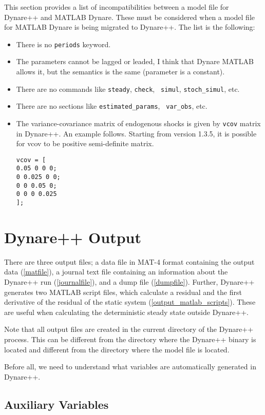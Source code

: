 \documentclass[10pt]{article}
\begin{document}
This section provides a list of incompatibilities between a model file
for Dy\-na\-re++ and MATLAB Dynare. These must be considered when a model
file for MATLAB Dynare is being migrated to Dynare++. The list is the
following:
\begin{itemize}
\item There is no {\tt periods} keyword.
\item The parameters cannot be lagged or leaded, I think that Dynare
MATLAB allows it, but the semantics is the same (parameter is a
constant).
\item There are no commands like {\tt steady}, {\tt check}, {\tt
simul}, {\tt stoch\_simul}, etc.
\item There are no sections like {\tt estimated\_params}, {\tt
var\_obs}, etc.
\item The variance-covariance matrix of endogenous shocks is given by
{\tt vcov} matrix in Dynare++. An example follows. Starting from
version 1.3.5, it is possible for vcov to be positive semi-definite
matrix.
{\small
\begin{verbatim}
vcov = [
0.05 0 0 0;
0 0.025 0 0;
0 0 0.05 0;
0 0 0 0.025
];
\end{verbatim}
}

\end{itemize}

\section{Dynare++ Output}

There are three output files; a data file in MAT-4 format containing
the output data (\ref{matfile}), a journal text file containing an
information about the Dynare++ run (\ref{journalfile}), and a dump
file (\ref{dumpfile}). Further, Dynare++ generates two MATLAB script
files, which calculate a residual and the first derivative of the
residual of the static system (\ref{output_matlab_scripts}). These are
useful when calculating the deterministic steady state outside
Dynare++.

Note that all output files are created in the current directory of
the Dynare++ process. This can be different from the directory where
the Dynare++ binary is located and different from the directory where
the model file is located.

Before all, we need to understand what variables are automatically
generated in Dynare++.

\subsection{Auxiliary Variables}
\label{aux_var}
\end{document}

